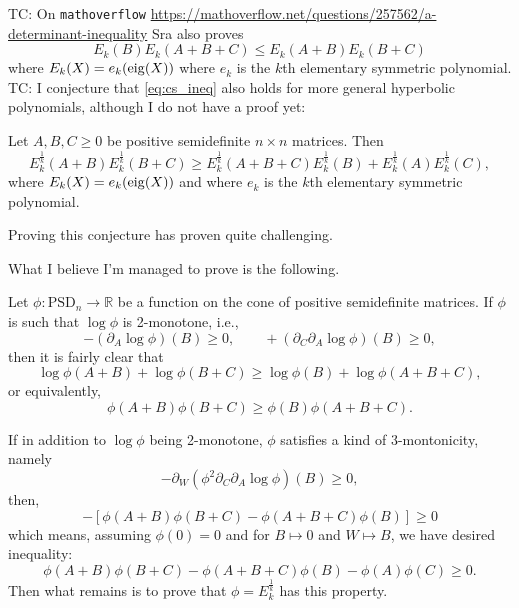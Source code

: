 \documentclass[notitlepage, 10pt]{article}
\begin{document}
{\color{blue}
TC: On \texttt{mathoverflow} \url{https://mathoverflow.net/questions/257562/a-determinant-inequality}
Sra also proves
\begin{equation}
    E_k(B)E_k(A+B+C) \leq E_k(A+B) E_k(B+C)
\end{equation}
where $E_k(X) = e_{k}(\operatorname{eig}(X))$ where $e_k$ is the $k$th elementary symmetric polynomial.
TC: I conjecture that \cref{eq:cs_ineq} also holds for more general hyperbolic polynomials, although I do not have a proof yet:
\begin{conj}
    Let $A,B,C \geq 0$ be positive semidefinite $n\times n$ matrices.
    Then
    \begin{equation}
        \label{eq:cs_ineq_conjecture}
        E_k^{\frac{1}{k}}(A+B) E_k^{\frac{1}{k}}(B+C) \geq E_k^{\frac{1}{k}}(A+B+C)E_k^{\frac{1}{k}}(B) + E_k^{\frac{1}{k}}(A) E_k^{\frac{1}{k}}(C),
    \end{equation}
    where $E_k(X) = e_{k}(\operatorname{eig}(X))$ and where $e_k$ is the $k$th elementary symmetric polynomial.
\end{conj}
}
{\color{red!80!black}
Proving this conjecture has proven quite challenging.

What I believe I'm managed to prove is the following.

Let $\phi : \mathrm{PSD}_n \to \mathbb R$ be a function on the cone of positive semidefinite matrices.
If $\phi$ is such that $\log \phi$ is 2-monotone, i.e.,
\begin{equation}
    - (\partial_{A}\log \phi)(B) \geq 0, \qquad +(\partial_{C}\partial_{A}\log \phi)(B) \geq 0,
\end{equation}
then it is fairly clear that
\begin{equation}
    \log \phi(A+B) + \log \phi(B+C) \geq \log \phi(B) + \log \phi(A+B+C),
\end{equation}
or equivalently,
\begin{equation}
    \phi(A+B)\phi(B+C) \geq \phi(B) \phi(A+B+C).
\end{equation}

If in addition to $\log \phi$ being 2-monotone, $\phi$ satisfies a kind of 3-montonicity, namely
\begin{equation}
    -\partial_{W}(\phi^2 \partial_{C}\partial_{A}\log \phi)(B) \geq 0,
\end{equation}
then,
\begin{equation}
    [\phi(A+B+W)\phi(B+C+W) - \phi(A+B+C+W)\phi(B+W)] - [\phi(A+B)\phi(B+C) - \phi(A+B+C)\phi(B)] \geq 0
\end{equation}
which means, assuming $\phi(0) = 0$ and for $B\mapsto 0$ and $W \mapsto B$, we have desired inequality:
\begin{equation}
    \phi(A+B)\phi(B+C) - \phi(A+B+C)\phi(B) - \phi(A)\phi(C) \geq 0.
\end{equation}
Then what remains is to prove that $\phi = E_k^{\frac{1}{k}}$ has this property.
}
\end{document}
